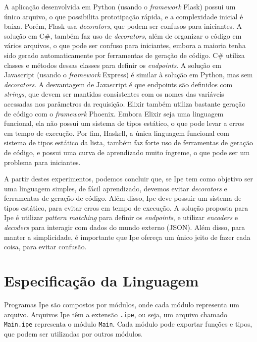 \documentclass[12pt]{article}
\begin{document}
A aplicação desenvolvida em Python (usando o \textit{framework} Flask) possui um único arquivo, o
que possibilita prototipação rápida, e a complexidade inicial é baixa. Porém, Flask usa
\textit{decorators}, que podem ser confusos para iniciantes. A solução em C\#, também faz uso de
\textit{decorators}, além de organizar o código em vários arquivos, o que pode ser confuso para
iniciantes, embora a maioria tenha sido gerado automaticamente por ferramentas de geração de código.
C\# utiliza classes e métodos dessas classes para definir os \textit{endpoints}. A solução em
Javascript (usando o \textit{framework} Express) é similar à solução em Python, mas sem \textit{decorators}.
A desvantagem de Javascript é que endpoints são definidos com \textit{strings}, que devem ser
mantidas consistentes com os nomes das variáveis acessadas nos parâmetros da requisição. Elixir também
utiliza bastante geração de código com o \textit{framework} Phoenix. Embora Elixir seja uma linguagem
funcional, ela não possui um sistema de tipos estático, o que pode levar a erros em tempo de execução.
Por fim, Haskell, a única linguagem funcional com sistema de tipos estático da lista, também faz forte
uso de ferramentas de geração de código, e possui uma curva de aprendizado muito íngreme, o que pode
ser um problema para iniciantes.

A partir destes experimentos, podemos concluir que, se Ipe tem como objetivo ser uma linguagem simples,
de fácil aprendizado, devemos evitar \textit{decorators} e ferramentas de geração de código. Além disso,
Ipe deve possuir um sistema de tipos estático, para evitar erros em tempo de execução. A solução
proposta para Ipe é utilizar \textit{pattern matching} para definir os \textit{endpoints}, e
utilizar \textit{encoders} e \textit{decoders} para interagir com dados do mundo externo (JSON). Além
disso, para manter a simplicidade, é importante que Ipe ofereça um único jeito de fazer cada coisa,
para evitar confusão.

\section{Especificação da Linguagem}

Programas Ipe são compostos por módulos, onde cada módulo representa um arquivo. Arquivos Ipe têm a
extensão \texttt{.ipe}, ou seja, um arquivo chamado \texttt{Main.ipe} representa o módulo \texttt{Main}.
Cada módulo pode exportar funções e tipos, que podem ser utilizadas por outros módulos.
\end{document}
